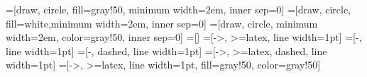 \newcommand{\nodesize}{2em}
\newcommand{\edgeunit}{2*\nodesize}
=[draw, circle, fill=gray!50, minimum width=\nodesize, inner sep=0]
=[draw, circle, fill=white,minimum width=\nodesize, inner sep=0]
=[draw, circle, minimum width=\nodesize, color=gray!50, inner sep=0]
=[]
=[->, >=latex, line width=1pt]
=[-, line width=1pt]
=[-, dashed, line width=1pt]
=[->, >=latex, dashed, line width=1pt]
=[->, >=latex, line width=1pt, fill=gray!50, color=gray!50]


